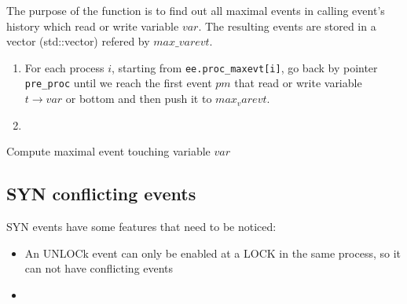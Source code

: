 \documentclass{llncs}
\begin{document}
\begin{algorithm}
The purpose of the function is to find out all maximal events in calling event's history which read or write variable $var$. The resulting events are stored in a vector (std::vector) refered by $max\_varevt$.  
\begin{enumerate}
\item
	For each process $i$, starting from \verb!ee.proc_maxevt[i]!, go back by pointer \verb!pre_proc! until we reach the first event $pm$ that read or write variable $t \rightarrow var$ or bottom and then push it to $max_varevt$.
\item
	
\end{enumerate}

\label{a:pre_max}
\caption{Compute maximal event touching variable $var$ }
\end{algorithm}

\subsection{SYN conflicting events}
SYN events have some features that need to be noticed:
\begin{itemize}
\item
	An UNLOCk event can only be enabled at a LOCK in the same process, so it can not have conflicting events
\item
	
	
\end{itemize}
\end{document}

